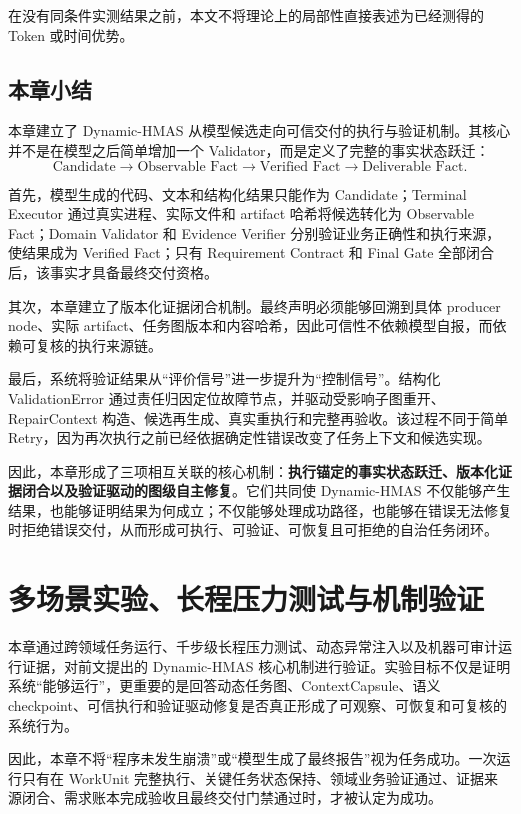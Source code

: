 \documentclass[UTF8,a4paper,12pt,oneside]{ctexbook}
\begin{document}
在没有同条件实测结果之前，本文不将理论上的局部性直接表述为已经测得的 Token 或时间优势。


\section{本章小结}

本章建立了 Dynamic-HMAS 从模型候选走向可信交付的执行与验证机制。其核心并不是在模型之后简单增加一个 Validator，而是定义了完整的事实状态跃迁：
\[
\text{Candidate}
\rightarrow
\text{Observable Fact}
\rightarrow
\text{Verified Fact}
\rightarrow
\text{Deliverable Fact}.
\]

首先，模型生成的代码、文本和结构化结果只能作为 Candidate；Terminal Executor 通过真实进程、实际文件和 artifact 哈希将候选转化为 Observable Fact；Domain Validator 和 Evidence Verifier 分别验证业务正确性和执行来源，使结果成为 Verified Fact；只有 Requirement Contract 和 Final Gate 全部闭合后，该事实才具备最终交付资格。

其次，本章建立了版本化证据闭合机制。最终声明必须能够回溯到具体 producer node、实际 artifact、任务图版本和内容哈希，因此可信性不依赖模型自报，而依赖可复核的执行来源链。

最后，系统将验证结果从“评价信号”进一步提升为“控制信号”。结构化 ValidationError 通过责任归因定位故障节点，并驱动受影响子图重开、RepairContext 构造、候选再生成、真实重执行和完整再验收。该过程不同于简单 Retry，因为再次执行之前已经依据确定性错误改变了任务上下文和候选实现。

因此，本章形成了三项相互关联的核心机制：\textbf{执行锚定的事实状态跃迁、版本化证据闭合以及验证驱动的图级自主修复}。它们共同使 Dynamic-HMAS 不仅能够产生结果，也能够证明结果为何成立；不仅能够处理成功路径，也能够在错误无法修复时拒绝错误交付，从而形成可执行、可验证、可恢复且可拒绝的自治任务闭环。

\chapter{多场景实验、长程压力测试与机制验证}

本章通过跨领域任务运行、千步级长程压力测试、动态异常注入以及机器可审计运行证据，对前文提出的 Dynamic-HMAS 核心机制进行验证。实验目标不仅是证明系统“能够运行”，更重要的是回答动态任务图、ContextCapsule、语义 checkpoint、可信执行和验证驱动修复是否真正形成了可观察、可恢复和可复核的系统行为。

因此，本章不将“程序未发生崩溃”或“模型生成了最终报告”视为任务成功。一次运行只有在 WorkUnit 完整执行、关键任务状态保持、领域业务验证通过、证据来源闭合、需求账本完成验收且最终交付门禁通过时，才被认定为成功。
\end{document}
